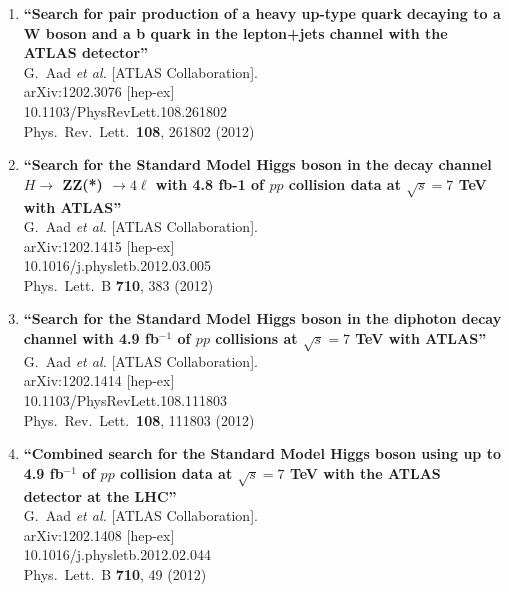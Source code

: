 \documentclass{article}
\begin{document}
\begin{enumerate}
\item%
{\bf ``Search for pair production of a heavy up-type quark decaying to a W boson and a b quark in the lepton+jets channel with the ATLAS detector''}
  \\{}G.~Aad {\it et al.}  [ATLAS Collaboration].
  \\{}arXiv:1202.3076 [hep-ex]
    \\{}10.1103/PhysRevLett.108.261802
\\{}Phys.\ Rev.\ Lett.\  {\bf 108}, 261802 (2012) %


\item%
{\bf ``Search for the Standard Model Higgs boson in the decay channel $H \to$ ZZ(*) $\to 4 \ell$ with 4.8 fb-1 of $pp$ collision data at $\sqrt{s}=7$ TeV with ATLAS''}
  \\{}G.~Aad {\it et al.}  [ATLAS Collaboration].
  \\{}arXiv:1202.1415 [hep-ex]
    \\{}10.1016/j.physletb.2012.03.005
\\{}Phys.\ Lett.\ B {\bf 710}, 383 (2012) %


\item%
{\bf ``Search for the Standard Model Higgs boson in the diphoton decay channel with 4.9 fb$^{-1}$ of $pp$ collisions at $\sqrt{s}=7$ TeV with ATLAS''}
  \\{}G.~Aad {\it et al.}  [ATLAS Collaboration].
  \\{}arXiv:1202.1414 [hep-ex]
    \\{}10.1103/PhysRevLett.108.111803
\\{}Phys.\ Rev.\ Lett.\  {\bf 108}, 111803 (2012) %


\item%
{\bf ``Combined search for the Standard Model Higgs boson using up to 4.9 fb$^{-1}$ of $pp$ collision data at $\sqrt{s}=7$ TeV with the ATLAS detector at the LHC''}
  \\{}G.~Aad {\it et al.}  [ATLAS Collaboration].
  \\{}arXiv:1202.1408 [hep-ex]
    \\{}10.1016/j.physletb.2012.02.044
\\{}Phys.\ Lett.\ B {\bf 710}, 49 (2012) %



\end{enumerate}
\end{document}
